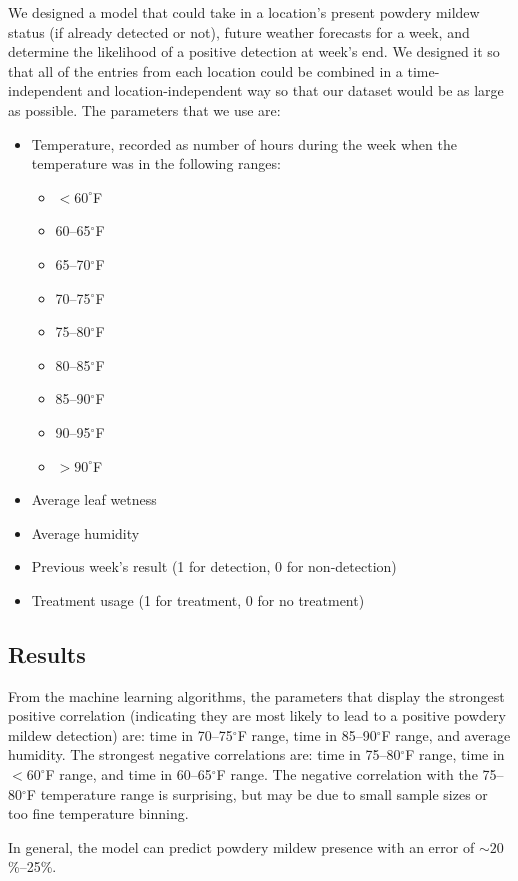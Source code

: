 \documentclass[letterpaper,12pt]{article}
\begin{document}
We designed a model that could take in a location's present powdery mildew status (if already detected or not), future weather forecasts for a week, and determine the likelihood of a positive detection at week's end.  We designed it so that all of the entries from each location could be combined in a time-independent and location-independent way so that our dataset would be as large as possible. The parameters that we use are:
\begin{itemize}
\item Temperature, recorded as number of hours during the week when the temperature was in the following ranges:
	\begin{itemize}
	\item $<60^\circ$F
	\item 60--65$^\circ$F
	\item 65--70$^\circ$F
	\item 70--75$^\circ$F
	\item 75--80$^\circ$F
	\item 80--85$^\circ$F
	\item 85--90$^\circ$F
	\item 90--95$^\circ$F
	\item $>90^\circ$F
	\end{itemize}
\item Average leaf wetness
\item Average humidity
\item Previous week's result (1 for detection, 0 for non-detection)
\item Treatment usage (1 for treatment, 0 for no treatment)
\end{itemize}

\subsection{Results}

From the machine learning algorithms, the parameters that display the strongest positive correlation (indicating they are most likely to lead to a positive powdery mildew detection) are:  time in 70--75$^\circ$F range, time in 85--90$^\circ$F range, and average humidity. The strongest negative correlations are: time in 75--80$^\circ$F range, time in $<60^\circ$F range, and time in 60--65$^\circ$F range. The negative correlation with the 75--80$^\circ$F temperature range is surprising, but may be due to small sample sizes or too fine temperature binning. 

In general, the model can predict powdery mildew presence with an error of $\sim 20$\%--25\%. 
\end{document}

